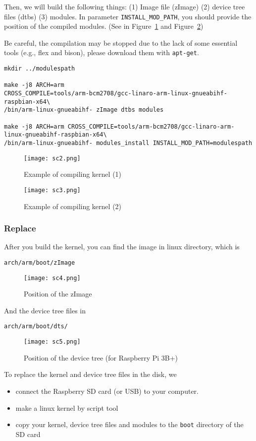 Then, we will build the following things: (1) Image file (zImage) (2) 
device tree files (dtbs) (3) modules. In parameter 
\texttt{INSTALL\_MOD\_PATH}, you should provide the position of the 
compiled modules. (See in Figure~\ref{fig:sc2} and 
Figure~\ref{fig:sc3})


Be careful, the compilation may be stopped due to the lack of some 
essential tools (e.g., flex and bison), please download them with 
\texttt{apt-get}.

\begin{lstlisting}
mkdir ../modulespath

make -j8 ARCH=arm 
CROSS_COMPILE=tools/arm-bcm2708/gcc-linaro-arm-linux-gnueabihf-raspbian-x64\
/bin/arm-linux-gnueabihf- zImage dtbs modules

make -j8 ARCH=arm CROSS_COMPILE=tools/arm-bcm2708/gcc-linaro-arm-linux-gnueabihf-raspbian-x64\
/bin/arm-linux-gnueabihf- modules_install INSTALL_MOD_PATH=modulespath
\end{lstlisting}

\begin{figure}[H]
	\centering
	\texttt{[image: sc2.png]}
	\caption{Example of compiling kernel (1)}
	\label{fig:sc2}
\end{figure}

\begin{figure}[H]
	\centering
	\texttt{[image: sc3.png]}
	\caption{Example of compiling kernel (2)}
	\label{fig:sc3}
\end{figure}

\subsubsection{Replace}

After you build the kernel, you can find the image in linux directory, which is 
\begin{lstlisting}
arch/arm/boot/zImage
\end{lstlisting}
\begin{figure}[H]
	\centering
	\texttt{[image: sc4.png]}
	\caption{Position of the zImage}
\end{figure}
And the device tree files in 
\begin{lstlisting}
arch/arm/boot/dts/
\end{lstlisting}

\begin{figure}[H]
	\centering
	\texttt{[image: sc5.png]}
	\caption{Position of the device tree (for Raspberry Pi 3B+)}
\end{figure}
To replace the kernel and device tree files in the disk, we 
\begin{itemize}
	\item connect the Raspberry SD card (or USB) to your computer.
	\item make a linux kernel by script tool
	\item copy your kernel, device tree files and modules to the \texttt{boot} directory of the SD card
\end{itemize}



